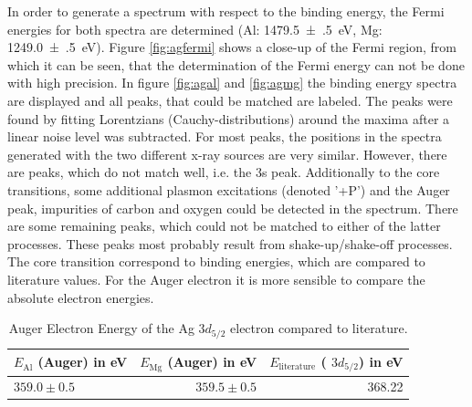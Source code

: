 \documentclass[a4paper]{scrartcl}
\numberwithin{equation}{section}
\numberwithin{figure}{section}
\numberwithin{table}{section}
\begin{document}
In order to generate a spectrum with respect to the binding energy, the Fermi energies for both spectra are determined (Al: \SI{1479.5(5)}{eV}, Mg: \SI{1249.0(5)}{eV}). Figure \ref{fig:agfermi} shows a close-up of the Fermi region, from which it can be seen, that the determination of the Fermi energy can not be done with high precision. In figure \ref{fig:agal} and \ref{fig:agmg} the binding energy spectra are displayed and all peaks, that could be matched are labeled. The peaks were found by fitting Lorentzians (Cauchy-distributions) around the maxima after a linear noise level was subtracted. For most peaks, the positions in the spectra generated with the two different x-ray sources are very similar. However, there are peaks, which do not match well, i.e. the 3s peak. Additionally to the core transitions, some additional plasmon excitations (denoted '+P') and the Auger peak, impurities of carbon and oxygen could be detected in the spectrum. There are some remaining peaks, which could not be matched to either of the latter processes. These peaks most probably result from shake-up/shake-off processes.
The core transition correspond to binding energies, which are compared to literature values. For the Auger electron it is more sensible to compare the absolute electron energies.
\begin{table}
\centering
\begin{tabular}{lrr}
\toprule
$E_\text{Al}$ (Auger) in eV & $E_\text{Mg}$ (Auger) in eV  & $E_\text{literature}$ ( $3d_{5/2}$) in eV  \\
\midrule
 $359.0 \pm 0.5$ &$ 359.5 \pm 0.5$ & 368.22 \\
 \bottomrule
 \end{tabular}
 \caption{ \small Auger Electron Energy of the Ag $3d_{5/2}$ electron compared to literature.\cite{augerpaper}}
 \label{tab:auger}
\end{table}
\end{document}
